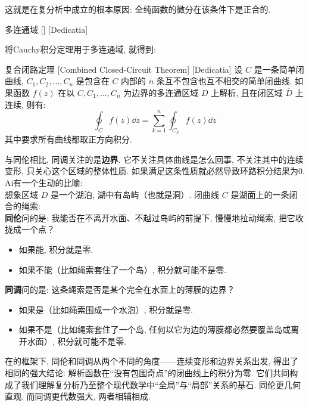 \documentclass[UTF8]{ctexart}
\begin{document}
        这就是\CauchyThm 在复分析中成立的根本原因: 全纯函数的微分在该条件下是正合的. 

        \begin{dfn}
            [UUID]
            {多连通域}
            []
            [Dedicatia]
        \end{dfn}

        将Cauchy积分定理用于多连通域, 就得到: 

        \begin{thm}
            [CombinedClosedCircuit]
            {复合闭路定理}
            [Combined Closed-Circuit Theorem]
            [Dedicatia]
            设  \(C\)  是一条简单闭曲线,  \(C_1, C_2, \ldots, C_n\)  是包含在  \(C\)  内部的  \(n\)  条互不包含也互不相交的简单闭曲线. 如果函数  \(f(z)\)  在以  \(C, C_1, \ldots, C_n\)  为边界的多连通区域 \(D\) 上解析, 且在闭区域  \(\overline{D}\)  上连续, 则有: 
            \[\oint_C f(z) \dd z = \sum_{k=1}^n \oint_{C_k} f(z) \dd z\]
            其中要求所有曲线都取正方向积分. 
        \end{thm}

        与同伦相比, 同调关注的是\textbf{边界}. 它不关注具体曲线是怎么回事, 不关注其中的连续变形, 只关心这个区域的整体性质. 如果满足这条性质就必然导致环路积分结果为0.\\
        Ai有一个生动的比喻:\\
        想象区域  \(D\)  是一个湖泊, 湖中有岛屿（也就是洞）. 闭曲线  \(C\)  是湖面上的一条闭合的绳索:\\
        \textbf{同伦}问的是: 我能否在不离开水面、不越过岛屿的前提下, 慢慢地拉动绳索, 把它收拢成一个点？

        \begin{itemize}
            \item 如果能, 积分就是零. 
            \item 如果不能（比如绳索套住了一个岛）, 积分就可能不是零. 
        \end{itemize}

        \textbf{同调}问的是: 这条绳索是否是某个完全在水面上的薄膜的边界？

        \begin{itemize}
            \item 如果是（比如绳索围成一个水泡）, 积分就是零. 
            \item 如果不是（比如绳索套住了一个岛, 任何以它为边的薄膜都必然要覆盖岛或离开水面）, 积分就可能不是零. 
        \end{itemize}

        在\CauchyThm 的框架下, 同伦和同调从两个不同的角度——连续变形和边界关系出发, 得出了相同的强大结论: 解析函数在“没有包围奇点”的闭曲线上的积分为零. 它们共同构成了我们理解复分析乃至整个现代数学中“全局”与“局部”关系的基石. 同伦更几何直观, 而同调更代数强大, 两者相辅相成. 
\end{document}
